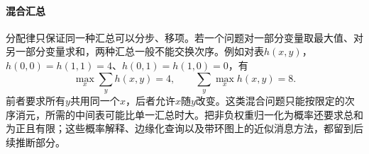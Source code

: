 \paragraph{混合汇总}
分配律只保证同一种汇总可以分步、移项。若一个问题对一部分变量取最大值、对另一部分变量求和，两种汇总一般不能交换次序。例如对表$h(x,y)$，$h(0,0)=h(1,1)=4$、$h(0,1)=h(1,0)=0$，有
\[
\max_x\sum_y h(x,y)=4,\qquad \sum_y\max_x h(x,y)=8 .
\]
前者要求所有$y$共用同一个$x$，后者允许$x$随$y$改变。这类混合问题只能按限定的次序消元，所需的中间表可能比单一汇总时大。把非负权重归一化为概率还要求总和为正且有限；这些概率解释、边缘化查询以及带环图上的近似消息方法，都留到后续推断部分。
